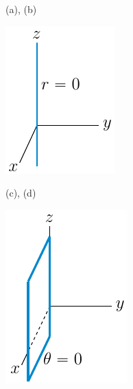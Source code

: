 \begin{answer}
(a), (b)
\begin{center}
   \includegraphics{fig/cylR0.pdf}\qquad\qquad
\end{center}

(c), (d)
\begin{center}
   \includegraphics{fig/cylTh0.pdf}\qquad\qquad
\end{center}

\end{answer}

